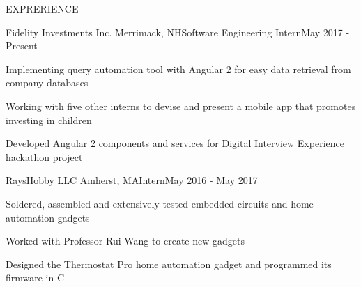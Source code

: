 \documentclass{resume} %
\begin{document}
	\begin{rSection}{EXPRERIENCE}
			
		\begin{rSubsection}{Fidelity Investments Inc.} {Merrimack, NH}{Software Engineering Intern}{May 2017 - Present}
			\item Implementing query automation tool with Angular 2 for easy data retrieval from company databases
			\item Working with five other interns to devise and present a mobile app that promotes investing in children
			\item Developed Angular 2 components and services for Digital Interview Experience hackathon project
		\end{rSubsection}
	
		\begin{rSubsection}{RaysHobby LLC} {Amherst, MA}{Intern}{May 2016 - May 2017}
			\item Soldered, assembled and extensively tested embedded circuits and home automation gadgets
			\item Worked with Professor Rui Wang to create new gadgets
			\item Designed the Thermostat Pro home automation gadget and programmed its firmware in C
		\end{rSubsection}
	
	\end{rSection}
	
	
\end{document}
